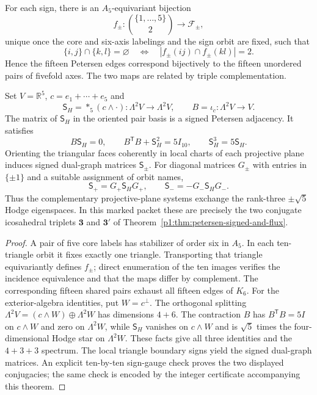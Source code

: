 \documentclass[11pt]{article}
\begin{document}
\begin{theorem}
\label{p1:thm:kneser-five-six-hodge-duality}
For each sign, there is an $A_5$-equivariant bijection
\[
 f_\pm:\binom{\{1,\dots,5\}}2\longrightarrow\mathcal F_\pm,
\]
unique once the core and six-axis labelings and the sign orbit are
fixed, such that
\[
 \{i,j\}\cap\{k,l\}=\varnothing
 \quad\Longleftrightarrow\quad
 |f_\pm(ij)\cap f_\pm(kl)|=2.
\]
Hence the fifteen Petersen edges correspond bijectively to the
fifteen unordered pairs of fivefold axes. The two maps are related
by triple complementation.

Set $V=\mathbb R^5$, $c=e_1+\cdots+e_5$ and
\[
 \mathsf S_H=*_5(c\wedge\cdot):\Lambda^2V\to\Lambda^2V,
 \qquad B=\iota_c:\Lambda^2V\to V.
\]
The matrix of $\mathsf S_H$ in the oriented pair basis is a signed
Petersen adjacency. It satisfies
\[
 B\mathsf S_H=0,\qquad B^{\mathsf T}B+\mathsf S_H^2=5I_{10},
 \qquad\mathsf S_H^3=5\mathsf S_H.
\]
Orienting the triangular faces coherently in local charts of each
projective plane induces signed dual-graph matrices $\mathsf S_\pm$.
For diagonal matrices $G_\pm$ with entries in $\{\pm1\}$ and a
suitable assignment of orbit names,
\[
 \boxed{\mathsf S_+=G_+\mathsf S_HG_+,\qquad
 \mathsf S_-=-G_-\mathsf S_HG_-.}
\]
Thus the complementary projective-plane systems exchange the
rank-three $\pm\sqrt5$ Hodge eigenspaces. In this marked packet these
are precisely the two conjugate icosahedral triplets $\mathbf3$ and
$\mathbf3'$ of Theorem~\ref{p1:thm:petersen-signed-and-flux}.
\end{theorem}
\begin{proof}
A pair of five core labels has stabilizer of order six in $A_5$.
In each ten-triangle orbit it fixes exactly one triangle. Transporting
that triangle equivariantly defines $f_\pm$; direct enumeration of the
ten images verifies the incidence equivalence and that the maps differ
by complement. The corresponding fifteen shared pairs exhaust all
fifteen edges of $K_6$. For the exterior-algebra identities, put
$W=c^\perp$. The orthogonal splitting
$\Lambda^2V=(c\wedge W)\oplus\Lambda^2W$ has dimensions $4+6$.
The contraction $B$ has $B^{\mathsf T}B=5I$ on $c\wedge W$ and
zero on $\Lambda^2W$, while $\mathsf S_H$ vanishes on $c\wedge W$
and is $\sqrt5$ times the four-dimensional Hodge star on
$\Lambda^2W$. These facts give all three identities and the
$4+3+3$ spectrum. The local triangle boundary signs yield the signed
dual-graph matrices. An explicit ten-by-ten sign-gauge check proves
the two displayed conjugacies; the same check is encoded by the
integer certificate accompanying this theorem.
\end{proof}
\end{document}
